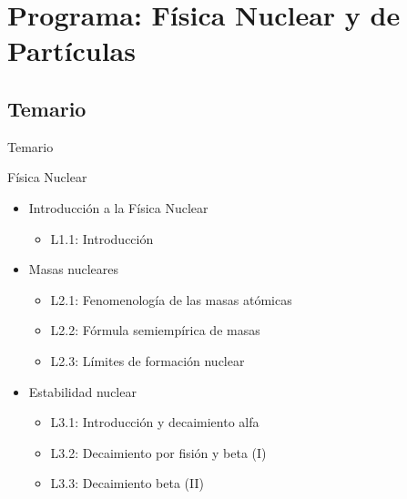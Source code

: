 \documentclass{beamer}
\begin{document}
\section{Programa: Física Nuclear y de Partículas}
\subsection{Temario}
\begin{frame}{Temario}
    \begin{Large}Física Nuclear\end{Large}
    \begin{itemize}
        \item Introducción a la Física Nuclear
\begin{itemize}
        \item L1.1: Introducción
\end{itemize}        
        \item Masas nucleares
\begin{itemize}
        \item L2.1: Fenomenología de las masas atómicas
        \item L2.2: Fórmula semiempírica de masas
        \item L2.3: Límites de formación nuclear
\end{itemize} 
        \item Estabilidad nuclear
\begin{itemize}
        \item L3.1: Introducción y decaimiento alfa   
        \item L3.2: Decaimiento por fisión y beta (I)
        \item L3.3: Decaimiento beta (II)
\end{itemize}      
    \end{itemize}
\end{frame}
\end{document}
